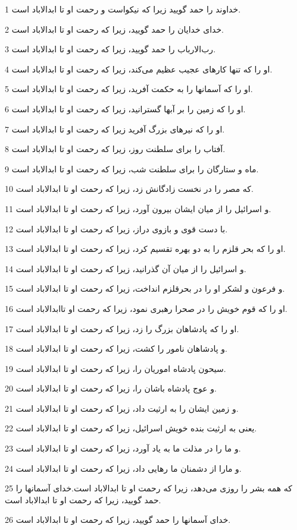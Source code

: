 \par 1 خداوند را حمد گویید زیرا که نیکواست و رحمت او تا ابدالاباد است.
\par 2 خدای خدایان را حمد گویید، زیرا که رحمت او تا ابدالاباد است.
\par 3 رب‌الارباب را حمد گویید، زیرا که رحمت او تا ابدالاباد است.
\par 4 او را که تنها کارهای عجیب عظیم می‌کند، زیرا که رحمت او تا ابدالاباد است.
\par 5 او را که آسمانها را به حکمت آفرید، زیرا که رحمت او تا ابدالاباد است.
\par 6 او را که زمین را بر آبها گسترانید، زیرا که رحمت او تا ابدالاباد است.
\par 7 او را که نیرهای بزرگ آفرید زیرا که رحمت او تا ابدالاباد است.
\par 8 آفتاب را برای سلطنت روز، زیرا که رحمت او تا ابدالاباد است.
\par 9 ماه و ستارگان را برای سلطنت شب، زیرا که رحمت او تا ابدالاباد است.
\par 10 که مصر را در نخست زادگانش زد، زیرا که رحمت او تا ابدالاباد است.
\par 11 و اسرائیل را از میان ایشان بیرون آورد، زیرا که رحمت او تا ابدالاباد است.
\par 12 با دست قوی و بازوی دراز، زیرا که رحمت او تا ابدالاباد است.
\par 13 او را که بحر قلزم را به دو بهره تقسیم کرد، زیرا که رحمت او تا ابدالاباد است.
\par 14 و اسرائیل را از میان آن گذرانید، زیرا که رحمت او تا ابدالاباد است.
\par 15 و فرعون و لشکر او را در بحرقلزم انداخت، زیرا که رحمت او تا ابدالاباد است.
\par 16 او را که قوم خویش را در صحرا رهبری نمود، زیرا که رحمت او تاابدالاباد است.
\par 17 او را که پادشاهان بزرگ را زد، زیرا که رحمت او تا ابدالاباد است.
\par 18 و پادشاهان نامور را کشت، زیرا که رحمت او تا ابدالاباد است.
\par 19 سیحون پادشاه اموریان را، زیرا که رحمت او تا ابدالاباد است.
\par 20 و عوج پادشاه باشان را، زیرا که رحمت او تا ابدالاباد است.
\par 21 و زمین ایشان را به ارثیت داد، زیرا که رحمت او تا ابدالاباد است.
\par 22 یعنی به ارثیت بنده خویش اسرائیل، زیرا که رحمت او تا ابدالاباد است.
\par 23 و ما را در مذلت ما به یاد آورد، زیرا که رحمت او تا ابدالاباد است.
\par 24 و مارا از دشمنان ما رهایی داد، زیرا که رحمت او تا ابدالاباد است.
\par 25 که همه بشر را روزی می‌دهد، زیرا که رحمت او تا ابدالاباد است.خدای آسمانها را حمد گویید، زیرا که رحمت او تا ابدالاباد است.
\par 26 خدای آسمانها را حمد گویید، زیرا که رحمت او تا ابدالاباد است.
 
